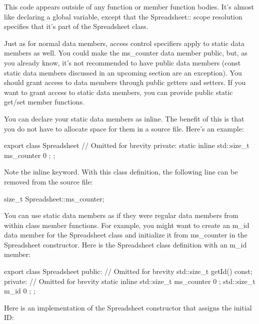 This code appears outside of any function or member function bodies. It’s almost like declaring a global variable, except that the Spreadsheet:: scope resolution specifies that it’s part of the Spreadsheet class.

Just as for normal data members, access control specifiers apply to static data members as well. You could make the ms\_counter data member public, but, as you already know, it’s not recommended to have public data members (const static data members discussed in an upcoming section are an exception). You should grant access to data members through public getters and setters. If you want to grant access to static data members, you can provide public static get/set member functions.


You can declare your static data members as inline. The benefit of this is that you do not have to allocate space for them in a source file. Here’s an example:

\begin{cpp}
export class Spreadsheet
{
    // Omitted for brevity
    private:
        static inline std::size_t ms_counter { 0 };
};
\end{cpp}

Note the inline keyword. With this class definition, the following line can be removed from the source file:

\begin{cpp}
size_t Spreadsheet::ms_counter;
\end{cpp}


You can use static data members as if they were regular data members from within class member functions. For example, you might want to create an m\_id data member for the Spreadsheet class and initialize it from ms\_counter in the Spreadsheet constructor. Here is the Spreadsheet class definition with an m\_id member:

\begin{cpp}
export class Spreadsheet
{
    public:
        // Omitted for brevity
        std::size_t getId() const;
    private:
        // Omitted for brevity
        static inline std::size_t ms_counter { 0 };
        std::size_t m_id { 0 };
};
\end{cpp}

Here is an implementation of the Spreadsheet constructor that assigns the initial ID:

